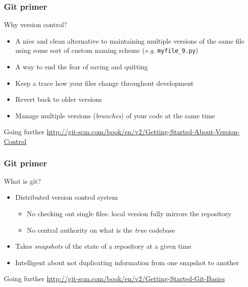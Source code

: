 \documentclass[mathserif, xcolor=dvipsnames]{beamer}
\begin{document}
\begin{frame}
    \frametitle{Git primer}
    \begin{block}{Why version control?}
    \begin{itemize} \addtolength{\itemsep}{0.5\baselineskip}
        \item{A nice and clean alternative to maintaining multiple versions of
              the same file using some sort of custom naming scheme
              (\emph{e.g.} \texttt{myfile\_9.py})}
        \item{A way to end the fear of saving and quitting}
        \item{Keep a trace how your files change throughout development}
        \item{Revert back to older versions}
        \item{Manage multiple versions (\emph{branches}) of your code at the
              same time}
    \end{itemize}
    \end{block}

    \begin{alertblock}{Going further}
        \footnotesize
        \url{http://git-scm.com/book/en/v2/Getting-Started-About-Version-Control}
    \end{alertblock}
\end{frame}

\begin{frame}
    \frametitle{Git primer}
    \begin{block}{What is git?}
    \begin{itemize}\addtolength{\itemsep}{0.5\baselineskip}
        \item{Distributed version control system
              \begin{itemize}
                  \item{No checking out single files: local version fully
                        mirrors the repository}
                  \item{No central authority on what is the \emph{true}
                        codebase}
               \end{itemize}}
        \item{Takes \emph{snapshots} of the state of a repository at a given
              time}
        \item{Intelligent about not duplicating information from one snapshot
              to another}
    \end{itemize}
    \end{block}

    \begin{alertblock}{Going further}
        \footnotesize
        \url{http://git-scm.com/book/en/v2/Getting-Started-Git-Basics}
    \end{alertblock}
\end{frame}
\end{document}
